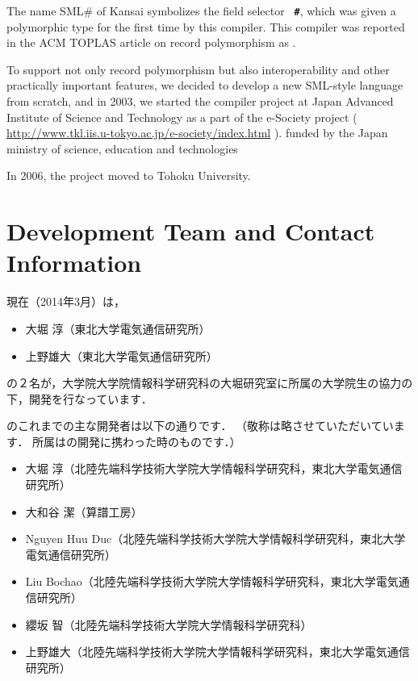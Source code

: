 	The name SML\# of Kansai symbolizes the field selector {\bf\tt
\#}, which was given a polymorphic type for the first
time by this compiler.
	This compiler was reported in the ACM TOPLAS article on record
polymorphism \cite{ohor95toplas} as {\bf \smlsharp{}}.

	To support not only record polymorphism but also
interoperability and other practically important features, we decided 
to develop a new SML-style language from scratch, and in 2003, we
started the \smlsharp{} compiler project at Japan Advanced Institute of 
Science and Technology as a part of the e-Society project 
(
\url{http://www.tkl.iis.u-tokyo.ac.jp/e-society/index.html}
).
funded by the Japan ministry of science, education and technologies

	In 2006, the project moved to Tohoku University.
\fi%

\section{
{\smlsharp{} Development Team and Contact Information}
}
\label{sec:smlsharpTeam}

\ifjp%
	現在（2014年3月）\smlsharp{}は，
\begin{itemize}
\item 
大堀 淳（東北大学電気通信研究所）
\item 
上野雄大（東北大学電気通信研究所）
\end{itemize}
の２名が，大学院大学院情報科学研究科の大堀研究室に所属の大学院生の協力の
下，開発を行なっています．

	\smlsharp{}のこれまでの主な開発者は以下の通りです．
	（敬称は略させていただいています．
	所属は\smlsharp{}の開発に携わった時のものです．）
\begin{itemize}
\item 大堀 淳（北陸先端科学技術大学院大学情報科学研究科，東北大学電気通信研究所）
\item 大和谷 潔（算譜工房）
\item Nguyen Huu Duc（北陸先端科学技術大学院大学情報科学研究科，東北大学電気通信研究所）
\item Liu Bochao（北陸先端科学技術大学院大学情報科学研究科，東北大学電気通信研究所）
\item 纓坂 智（北陸先端科学技術大学院大学情報科学研究科）
\item 上野雄大（北陸先端科学技術大学院大学情報科学研究科，東北大学電気通信研究所）
\end{itemize}

